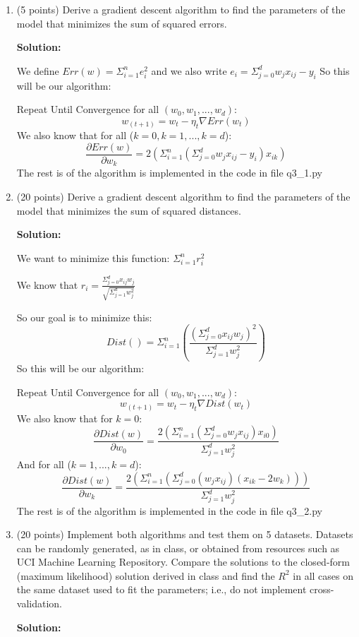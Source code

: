 \documentclass[twoside]{article}
\begin{document}
\begin{enumerate}
\item (5 points) Derive a gradient descent algorithm to find the parameters of the model that minimizes the sum of squared errors. 

\textbf{Solution:}

We define $Err(w)=\Sigma_{i=1}^ne_i^2$ and we also write $e_i=\Sigma_{j=0}^d w_jx_{ij} - y_i$ 
So this will be our algorithm:

Repeat Until Convergence for all $(w_0,w_1,...,w_d)$:
\[
w_{(t+1)} = w_t - \eta_t \nabla Err(w_t) 
\]
We also know that for all ($k=0, k=1, ..., k=d$):
\[
\frac{\partial Err(w)}{\partial w_k}
=
2(\Sigma_{i=1}^n(\Sigma_{j=0}^d w_jx_{ij} - y_i)x_{ik})
\]
The rest is of the algorithm is implemented in the code in file q3\_1.py

\item (20 points) Derive a gradient descent algorithm to find the parameters of the model that minimizes the sum of squared distances. 

\textbf{Solution:}

We want to minimize this function: $\Sigma_{i=1}^n{r_i^2}$

We know that $r_i = \frac{\Sigma_{j=0}^d{x_{ij}w_j}}{\sqrt{\Sigma_{j=1}^d{w_j^2}}}$

So our goal is to minimize this:
\[
Dist() = \Sigma_{i=1}^n{(
\frac
{(\Sigma_{j=0}^d{x_{ij}w_j})^2}
{\Sigma_{j=1}^d{w_j^2}}
)}
\]
So this will be our algorithm:

Repeat Until Convergence for all $(w_0,w_1,...,w_d)$:
\[
w_{(t+1)} = w_t - \eta_t \nabla Dist(w_t) 
\]
We also know that for $k=0$:
\[
\frac{\partial Dist(w)}{\partial w_0}
=
\frac
{2(\Sigma_{i=1}^n(\Sigma_{j=0}^d w_jx_{ij})x_{i0})}
{\Sigma_{j=1}^d{w_j^2}}
\]
And for all ($k=1, ..., k=d$):
\[
\frac{\partial Dist(w)}{\partial w_k}
=
\frac
{2(\Sigma_{i=1}^n(\Sigma_{j=0}^d (w_jx_{ij})(x_{ik}-2w_k)))}
{\Sigma_{j=1}^d{w_j^2}}
\]
The rest is of the algorithm is implemented in the code in file q3\_2.py


\item (20 points) Implement both algorithms and test them on 5 datasets. Datasets can be randomly generated, as in class, or obtained from resources such as UCI Machine Learning Repository. Compare the solutions to the closed-form (maximum likelihood) solution derived in class and find the $R^2$ in all cases on the same dataset used to fit the parameters; i.e., do not implement cross-validation.

\textbf{Solution:}


\end{enumerate}
\end{document}
